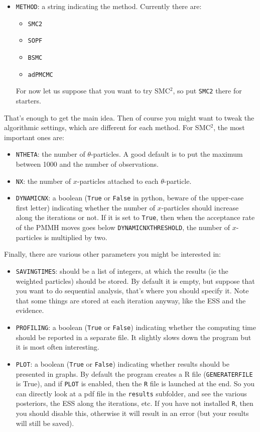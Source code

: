 \documentclass[a4paper,10pt]{paper}
\begin{document}
\begin{itemize}
\item \texttt{METHOD}: a string indicating the method. Currently there are:
\begin{itemize}
 \item \texttt{SMC2}
 \item \texttt{SOPF}
 \item \texttt{BSMC}
 \item \texttt{adPMCMC}
\end{itemize}
For now let us suppose that you want to try SMC$^2$, so put \texttt{SMC2} there for starters.
\end{itemize}

That's enough to get the main idea. Then of course you might want to tweak the algorithmic settings, which are different for each method.
For SMC$^2$, the most important ones are:
\begin{itemize}
 \item \texttt{NTHETA}: the number of $\theta$-particles. A good default is to put the maximum between 1000 and the number of observations.
 \item \texttt{NX}: the number of $x$-particles attached to each $\theta$-particle.
 \item \texttt{DYNAMICNX}: a boolean (\texttt{True} or \texttt{False} in python, beware of the upper-case first letter) indicating whether the number of $x$-particles should
increase along the iterations or not. If it is set to \texttt{True}, then when the acceptance rate of the PMMH moves goes below \texttt{DYNAMICNXTHRESHOLD}, the number
of $x$-particles is multiplied by two.
\end{itemize}

Finally, there are various other parameters you might be interested in:
\begin{itemize}
 \item \texttt{SAVINGTIMES}: should be a list of integers, at which the results (ie the weighted particles) should be stored. By default it is empty, but suppose
that you want to do sequential analysis, that's where you should specify it. Note that some things are stored at each iteration anyway, like the ESS and the evidence.
 \item \texttt{PROFILING}: a boolean (\texttt{True} or \texttt{False}) indicating whether the computing time should be reported in a separate file. It slightly slows down the program
but it is most often interesting.
 \item \texttt{PLOT}: a boolean (\texttt{True} or \texttt{False}) indicating whether results should be presented in graphs. By default the program creates a R file (\texttt{GENERATERFILE} is True),
and if \texttt{PLOT} is enabled, then the \texttt{R} file is launched at the end. So you can directly look at a pdf file in the \texttt{results} subfolder, and see the various posteriors, the ESS along the iterations, etc. If you have not installed \texttt{R}, then you should disable this, otherwise it will result in an error (but your results will still be saved).
\end{itemize}
\end{document}
